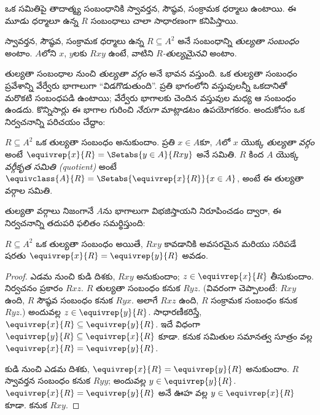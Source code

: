 \documentclass[../../../include/open-logic-section]{subfiles}
\begin{document}


ఒక సమితిపై తాదాత్మ్య సంబంధానికి స్వావర్తన, సౌష్ఠవ, సంక్రామక ధర్మాలు
ఉంటాయి. ఈ మూడు ధర్మాలూ ఉన్న $R$ సంబంధాలు చాలా సాధారణంగా కనిపిస్తాయి.

\begin{defn}[తుల్యతా సంబంధం] 
స్వావర్తన, సౌష్ఠవ, సంక్రామక ధర్మాలు ఉన్న $R \subseteq A^2$
అనే సంబంధాన్ని \emph{తుల్యతా సంబంధం} అంటాం.
$A$లోని  $x$, $y$లకు $Rxy$ ఉంటే, వాటిని
\emph{$R$-తుల్యమైనవి} అంటాం.
\end{defn}

తుల్యతా సంబంధాల నుంచి \emph{తుల్యతా వర్గం} అనే భావన వస్తుంది.
ఒక తుల్యతా సంబంధం ప్రవేశాన్ని వేర్వేరు భాగాలుగా ``విడగొడుతుంది''.
ప్రతి భాగంలోని వస్తువులన్నీ ఒకదానితో మరొకటి సంబంధపడి ఉంటాయి;
వేర్వేరు భాగాలకు చెందిన వస్తువుల మధ్య ఆ సంబంధం ఉండదు.
కొన్నిసార్లు ఈ భాగాల గురించి \emph{నేరుగా} మాట్లాడటం ఉపయోగకరం.
అందుకోసం ఒక నిర్వచనాన్ని పరిచయం చేద్దాం:

\begin{defn}
$R \subseteq A^2$ ఒక తుల్యతా సంబంధం అనుకుందాం.
ప్రతి $x \in A$కూ, $A$లో $x$ యొక్క \emph{తుల్యతా వర్గం} అంటే
$\equivrep{x}{R} = \Setabs{y \in A}{Rxy}$ అనే సమితి.
$R$ కింద $A$ యొక్క \emph{వర్గీకృత సమితి (quotient)} అంటే
$\equivclass{A}{R} = \Setabs{\equivrep{x}{R}}{x \in A}$,
అంటే ఈ తుల్యతా వర్గాల సమితి.
\end{defn}

తుల్యతా వర్గాలు నిజంగానే $A$ను భాగాలుగా విభజిస్తాయని నిరూపించడం
ద్వారా, ఈ నిర్వచనాన్ని తదుపరి ఫలితం సమర్థిస్తుంది:

\begin{prop}
$R \subseteq A^2$ ఒక తుల్యతా సంబంధం అయితే,
$Rxy$ కావడానికి అవసరమైన మరియు సరిపడే షరతు
$\equivrep{x}{R} = \equivrep{y}{R}$ అవడం.
\end{prop}

\begin{proof}
ఎడమ నుంచి కుడి దిశకు, $Rxy$ అనుకుందాం; $z \in \equivrep{x}{R}$
తీసుకుందాం. నిర్వచనం ప్రకారం $Rxz$. $R$ తుల్యతా సంబంధం కనుక $Ryz$.
(వివరంగా చెప్పాలంటే: $Rxy$ ఉంది, $R$ సౌష్ఠవ సంబంధం కనుక $Ryx$.
అలాగే $Rxz$ ఉంది, $R$ సంక్రామక సంబంధం కనుక $Ryz$.)
అందువల్ల $z \in \equivrep{y}{R}$. సాధారణీకరిస్తే,
$\equivrep{x}{R} \subseteq \equivrep{y}{R}$.
ఇదే విధంగా $\equivrep{y}{R} \subseteq \equivrep{x}{R}$ కూడా.
కనుక సమితుల సమానత్వ సూత్రం వల్ల
$\equivrep{x}{R} = \equivrep{y}{R}$.

కుడి నుంచి ఎడమ దిశకు, $\equivrep{x}{R} = \equivrep{y}{R}$ అనుకుందాం.
$R$ స్వావర్తన సంబంధం కనుక $Ryy$; అందువల్ల $y \in \equivrep{y}{R}$.
$\equivrep{x}{R} = \equivrep{y}{R}$ అనే ఊహ వల్ల
$y \in \equivrep{x}{R}$ కూడా. కనుక $Rxy$.
\end{proof}
\end{document}
